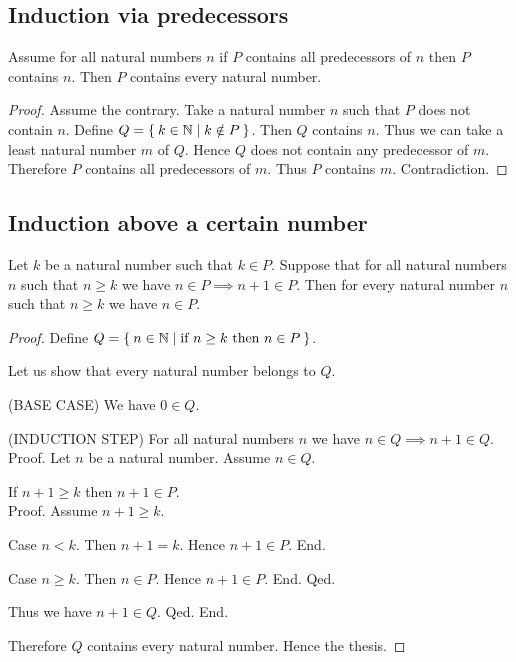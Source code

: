 \documentclass[../../natural-numbers.ftl.tex]{subfiles}
\begin{document}
  \subsection{Induction via predecessors}

  \begin{forthel}
    \begin{theorem}[NN 02 05 167446]
      Assume for all natural numbers $n$ if $P$ contains all predecessors of $n$ then $P$ contains $n$.
      Then $P$ contains every natural number.
    \end{theorem}
    \begin{proof}
      Assume the contrary.
      Take a natural number $n$ such that $P$ does not contain $n$.
      Define $Q = \Set{k \in \mathbb{N} | k \notin P}$.
      Then $Q$ contains $n$.
      Thus we can take a least natural number $m$ of $Q$.
      Hence $Q$ does not contain any predecessor of $m$.
      Therefore $P$ contains all predecessors of $m$.
      Thus $P$ contains $m$.
      Contradiction.
    \end{proof}
  \end{forthel}


  \subsection{Induction above a certain number}

  \begin{forthel}
    \begin{theorem}[NN 02 05 497603]
      Let $k$ be a natural number such that $k \in P$.
      Suppose that for all natural numbers $n$ such that $n \geq k$ we have $n \in P \implies n + 1 \in P$.
      Then for every natural number $n$ such that $n \geq k$ we have $n \in P$.
    \end{theorem}
    \begin{proof}
      Define $Q = \Set{n \in \mathbb{N} | \text{if $n \geq k$ then $n \in P$}}$.

      Let us show that every natural number belongs to $Q$.

        (BASE CASE) We have $0 \in Q$.

        (INDUCTION STEP) For all natural numbers $n$ we have $n \in Q \implies n + 1 \in Q$. \\
        Proof.
          Let $n$ be a natural number.
          Assume $n \in Q$.

          If $n + 1 \geq k$ then $n + 1 \in P$. \\
          Proof.
            Assume $n + 1 \geq k$.

            Case $n < k$.
              Then $n + 1 = k$.
              Hence $n + 1 \in P$.
            End.

            Case $n \geq k$.
              Then $n \in P$.
              Hence $n + 1 \in P$.
            End.
          Qed.

          Thus we have $n + 1 \in Q$.
        Qed.
      End.

      Therefore $Q$ contains every natural number.
      Hence the thesis.
    \end{proof}
  \end{forthel}
\end{document}
